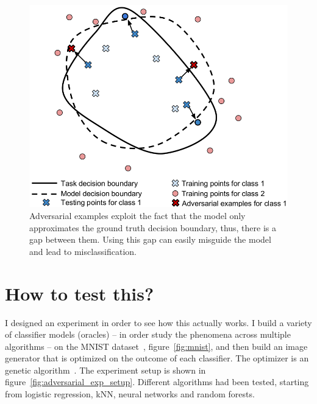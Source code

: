   \begin{figure}
    \centering
    \includegraphics[scale=0.3]{images/adv_attack/gen_er4.png}
    \caption{Adversarial examples exploit the fact that the model only approximates the ground truth decision boundary, thus, there is a gap between them. Using this gap can easily misguide the model and lead to misclassification.}
    \label{fig:gen_er4}
  \end{figure}

\section{How to test this?}
  \par I designed an experiment in order to see how this actually works. I build a variety of classifier models (oracles) -- in order study the phenomena across multiple algorithms -- on the MNIST dataset~\citep{lecun-mnisthandwrittendigit-2010}, figure~\ref{fig:mnist}, and then build an image generator that is optimized on the outcome of each classifier. The optimizer is an genetic algorithm~\citep{eiben2003introduction}. The experiment setup is shown in figure~\ref{fig:adversarial_exp_setup}. Different algorithms had been tested, starting from logistic regression, kNN, neural networks and random forests.


